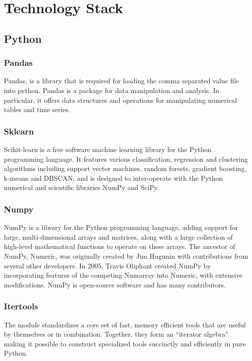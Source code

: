 \documentclass[12pt]{article}
\begin{document}
\newpage
\section{Technology Stack}
\subsection{Python}
\subsubsection{Pandas}
Pandas, is a library that is required for loading the comma separated value file into python. Pandas is a package for data manipulation and analysis. In particular, it offers data structures and operations for manipulating numerical tables and time series.

\subsubsection{Sklearn}
Scikit-learn is a free software machine learning library for the Python programming language. It features various classification, regression and clustering algorithms including support vector machines, random forests, gradient boosting, k-means and DBSCAN, and is designed to inter-operate with the Python numerical and scientific libraries NumPy and SciPy.

\subsubsection{Numpy}
NumPy is a library for the Python programming language, adding support for large, multi-dimensional arrays and matrices, along with a large collection of high-level mathematical functions to operate on these arrays. The ancestor of NumPy, Numeric, was originally created by Jim Hugunin with contributions from several other developers. In 2005, Travis Oliphant created NumPy by incorporating features of the competing Numarray into Numeric, with extensive modifications. NumPy is open-source software and has many contributors.

\subsubsection{Itertools}
The module standardizes a core set of fast, memory efficient tools that are useful by themselves or in combination. Together, they form an “iterator algebra” making it possible to construct specialized tools succinctly and efficiently in pure Python.
\end{document}
